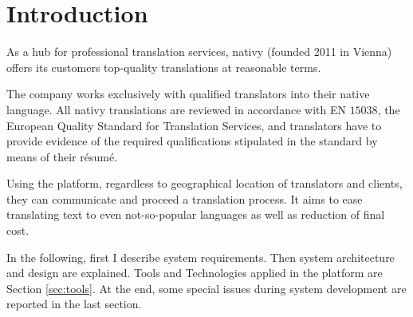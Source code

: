 \section{Introduction}
As a hub for professional translation services, nativy \cite{nativy}(founded 2011 in Vienna) offers its customers top-quality translations at reasonable terms. 

The company works exclusively with qualified translators into their native language. All nativy translations are reviewed in accordance with EN $15038$, the European Quality Standard for Translation Services, and translators have to provide evidence of the required qualifications stipulated in the standard by means of their résumé.

Using the platform, regardless to geographical location of translators and clients, they can communicate and proceed a translation process. It aims to ease translating text to even not-so-popular languages as well as reduction of final cost.

In the following, first I describe system requirements. Then system architecture and design are explained. Tools and Technologies applied in the platform are Section \ref{sec:tools}. At the end, some special issues during system development are reported in the last section.